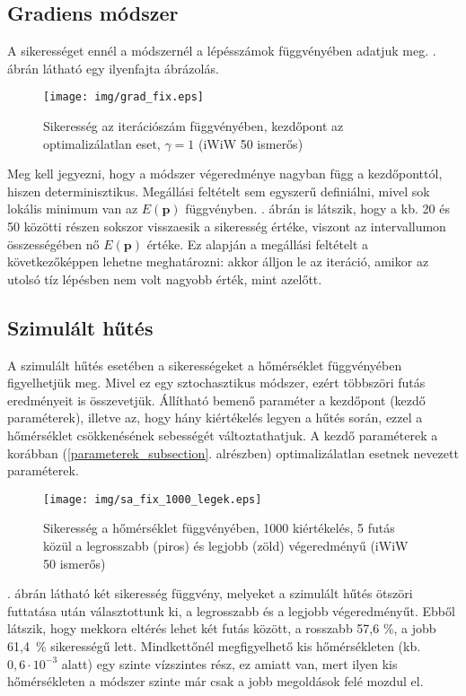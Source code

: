 \documentclass[12pt]{article}
\begin{document}
\subsection{Gradiens módszer}
A sikerességet ennél a módszernél a lépésszámok függvényében adatjuk meg. . ábrán látható egy ilyenfajta ábrázolás.
\begin{figure}[H]
	\centering
	\texttt{[image: img/grad\_fix.eps]}
	\caption{Sikeresség az iterációszám függvényében, kezdőpont az optimalizálatlan eset, $\gamma = 1$ (iWiW 50 ismerős)}
	\label{grad_fix}
\end{figure}
Meg kell jegyezni, hogy a módszer végeredménye nagyban függ a kezdőponttól, hiszen determinisztikus. Megállási feltételt sem egyszerű definiálni, mivel sok lokális minimum van az $E(\mathbf{p})$ függvényben. . ábrán is látszik, hogy a kb. 20 és 50 közötti részen sokszor visszaesik a sikeresség értéke, viszont az intervallumon összességében nő $E(\mathbf{p})$ értéke. Ez alapján a megállási feltételt a következőképpen lehetne meghatározni: akkor álljon le az iteráció, amikor az utolsó tíz lépésben nem volt nagyobb érték, mint azelőtt. %
\subsection{Szimulált hűtés}
A szimulált hűtés esetében a sikerességeket a hőmérséklet függvényében figyelhetjük meg. %
Mivel ez egy sztochasztikus módszer, ezért többszöri futás eredményeit is összevetjük. %
Állítható bemenő paraméter a kezdőpont (kezdő paraméterek), illetve az, hogy hány kiértékelés legyen a hűtés során, ezzel a hőmérséklet csökkenésének sebességét változtathatjuk. A kezdő paraméterek a korábban (\ref{parameterek_subsection}. alrészben) optimalizálatlan esetnek nevezett paraméterek. %
\begin{figure}[H]
	\centering
	\texttt{[image: img/sa\_fix\_1000\_legek.eps]}
	\caption{Sikeresség a hőmérséklet függvényében, 1000 kiértékelés, 5 futás közül a legrosszabb (piros) és legjobb (zöld) végeredményű (iWiW 50 ismerős)}
	\label{sa_legek}
\end{figure}
. ábrán látható két sikeresség függvény, melyeket a szimulált hűtés ötszöri futtatása után választottunk ki, a legrosszabb és a legjobb végeredményűt. Ebből látszik, hogy mekkora eltérés lehet két futás között, a rosszabb 57,6 \%, a jobb \mbox{61,4 \%} sikerességű lett. Mindkettőnél megfigyelhető kis hőmérsékleten (kb. \mbox{$0{,}6 \cdot 10^{-3}$} alatt) egy szinte vízszintes rész, ez amiatt van, mert ilyen kis hőmérsékleten a módszer szinte már csak a jobb megoldások felé mozdul el.
\end{document}
